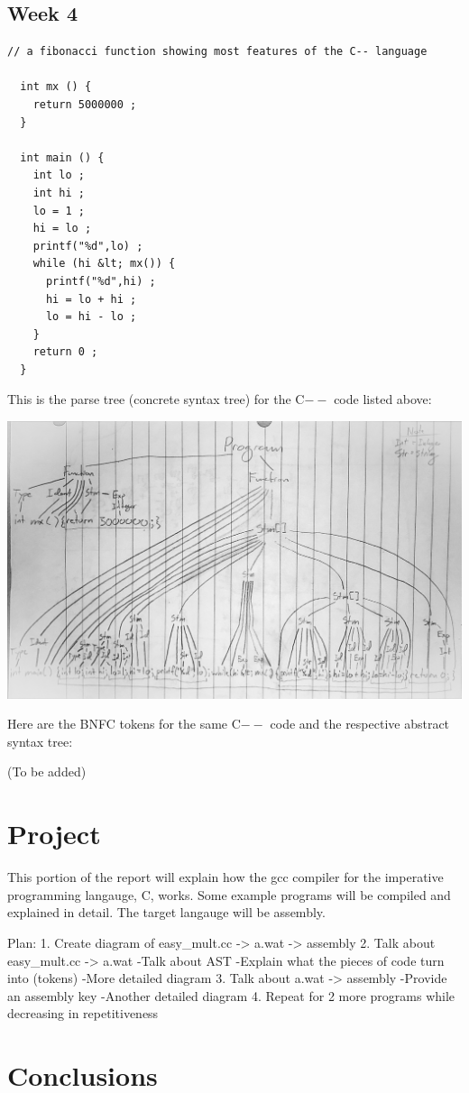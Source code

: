 \documentclass{article}
\theoremstyle{theorem}
\theoremstyle{definition}
\theoremstyle{remark}
\begin{document}
\subsection{Week 4}

\medskip\noindent
\begin{lstlisting}[style=CStyle]
  // a fibonacci function showing most features of the C-- language

  int mx () {
    return 5000000 ;
  }

  int main () {
    int lo ; 
    int hi ;
    lo = 1 ;
    hi = lo ;
    printf("%d",lo) ;
    while (hi &lt; mx()) {
      printf("%d",hi) ;
      hi = lo + hi ;
      lo = hi - lo ;
    }
    return 0 ;
  }
\end{lstlisting}

\medskip\noindent
This is the parse tree (concrete syntax tree) for the C$--$ code listed above:

\medskip\noindent
\includegraphics[width=1\textwidth]{Images/ConcreteSyntaxTree.jpg}

\medskip\noindent
Here are the BNFC tokens for the same C$--$ code and the respective abstract syntax tree:

\medskip\noindent
(To be added)

\section{Project}
\medskip\noindent
This portion of the report will explain how the gcc compiler for  the imperative programming langauge, C, works. Some example programs will be compiled and explained in detail. The target langauge will be assembly.

\medskip\noindent
Plan:
1. Create diagram of easy_mult.cc -> a.wat -> assembly
2. Talk about easy_mult.cc -> a.wat
    -Talk about AST
    -Explain what the pieces of code turn into (tokens)
    -More detailed diagram
3. Talk about a.wat -> assembly
    -Provide an assembly key
    -Another detailed diagram
4. Repeat for 2 more programs while decreasing in repetitiveness

\section{Conclusions}\label{conclusions}

\begin{thebibliography}{99}

\end{thebibliography}
\end{document}
